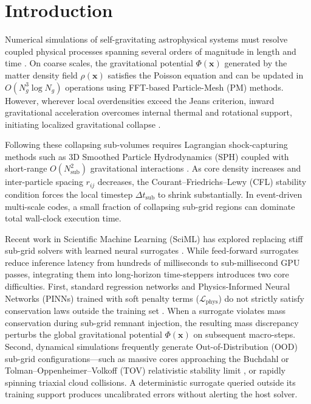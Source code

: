 \documentclass[10pt,twocolumn,letterpaper]{article}
\begin{document}
\section{Introduction}

Numerical simulations of self-gravitating astrophysical systems must resolve coupled physical processes spanning several orders of magnitude in length and time \cite{hockney1988, binney2008, springel2021}. On coarse scales, the gravitational potential $\Phi(\mathbf{x})$ generated by the matter density field $\rho(\mathbf{x})$ satisfies the Poisson equation and can be updated in $O(N_g^3 \log N_g)$ operations using FFT-based Particle-Mesh (PM) methods. However, wherever local overdensities exceed the Jeans criterion, inward gravitational acceleration overcomes internal thermal and rotational support, initiating localized gravitational collapse \cite{kippenhahn1990, shapiro1983}.

Following these collapsing sub-volumes requires Lagrangian shock-capturing methods such as 3D Smoothed Particle Hydrodynamics (SPH) coupled with short-range $O(N_{\text{sub}}^2)$ gravitational interactions \cite{monaghan1992, price2018}. As core density increases and inter-particle spacing $r_{ij}$ decreases, the Courant--Friedrichs--Lewy (CFL) stability condition forces the local timestep $\Delta t_{\text{sub}}$ to shrink substantially. In event-driven multi-scale codes, a small fraction of collapsing sub-grid regions can dominate total wall-clock execution time.

Recent work in Scientific Machine Learning (SciML) has explored replacing stiff sub-grid solvers with learned neural surrogates \cite{hirashima2023, raissi2019, li2021fno}. While feed-forward surrogates reduce inference latency from hundreds of milliseconds to sub-millisecond GPU passes, integrating them into long-horizon time-steppers introduces two core difficulties. First, standard regression networks and Physics-Informed Neural Networks (PINNs) trained with soft penalty terms ($\mathcal{L}_{\text{phys}}$) do not strictly satisfy conservation laws outside the training set \cite{raissi2019, beucler2021}. When a surrogate violates mass conservation during sub-grid remnant injection, the resulting mass discrepancy perturbs the global gravitational potential $\Phi(\mathbf{x})$ on subsequent macro-steps. Second, dynamical simulations frequently generate Out-of-Distribution (OOD) sub-grid configurations---such as massive cores approaching the Buchdahl or Tolman--Oppenheimer--Volkoff (TOV) relativistic stability limit \cite{buchdahl1959, shapiro1983}, or rapidly spinning triaxial cloud collisions. A deterministic surrogate queried outside its training support produces uncalibrated errors without alerting the host solver.
\end{document}
